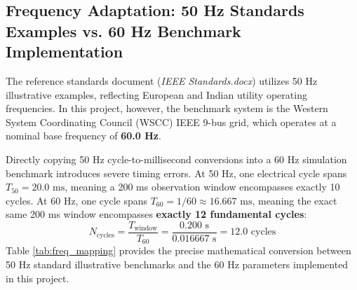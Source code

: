 \documentclass[12pt,a4paper]{report}
\begin{document}
\subsection{Frequency Adaptation: 50 Hz Standards Examples vs. 60 Hz Benchmark Implementation}
The reference standards document (\textit{IEEE Standards.docx}) utilizes 50 Hz illustrative examples, reflecting European and Indian utility operating frequencies. In this project, however, the benchmark system is the Western System Coordinating Council (WSCC) IEEE 9-bus grid, which operates at a nominal base frequency of \textbf{60.0 Hz}. 

Directly copying 50 Hz cycle-to-millisecond conversions into a 60 Hz simulation benchmark introduces severe timing errors. At 50 Hz, one electrical cycle spans $T_{50} = 20.0\text{ ms}$, meaning a 200 ms observation window encompasses exactly 10 cycles. At 60 Hz, one cycle spans $T_{60} = 1/60 \approx 16.667\text{ ms}$, meaning the exact same 200 ms window encompasses \textbf{exactly 12 fundamental cycles}:
\begin{equation}
N_{\text{cycles}} = \frac{T_{\text{window}}}{T_{60}} = \frac{0.200\text{ s}}{0.016667\text{ s}} = 12.0\text{ cycles}
\end{equation}
Table \ref{tab:freq_mapping} provides the precise mathematical conversion between 50 Hz standard illustrative benchmarks and the 60 Hz parameters implemented in this project.
\end{document}
